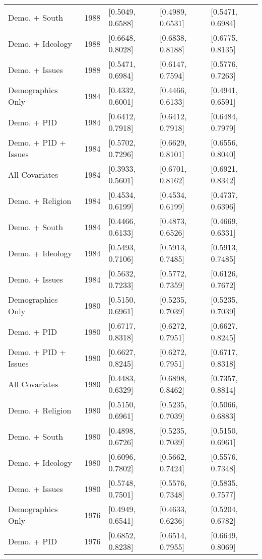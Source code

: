 \begin{longtable}{lrlll}
  Demo. + South & 1988 & [0.5049, 0.6588] & [0.4989, 0.6531] & [0.5471, 0.6984] \\ 
  Demo. + Ideology & 1988 & [0.6648, 0.8028] & [0.6838, 0.8188] & [0.6775, 0.8135] \\ 
  Demo. + Issues & 1988 & [0.5471, 0.6984] & [0.6147, 0.7594] & [0.5776, 0.7263] \\ 
  Demographics Only & 1984 & [0.4332, 0.6001] & [0.4466, 0.6133] & [0.4941, 0.6591] \\ 
  Demo. + PID & 1984 & [0.6412, 0.7918] & [0.6412, 0.7918] & [0.6484, 0.7979] \\ 
  Demo. + PID + Issues & 1984 & [0.5702, 0.7296] & [0.6629, 0.8101] & [0.6556, 0.8040] \\ 
  All Covariates & 1984 & [0.3933, 0.5601] & [0.6701, 0.8162] & [0.6921, 0.8342] \\ 
  Demo. + Religion & 1984 & [0.4534, 0.6199] & [0.4534, 0.6199] & [0.4737, 0.6396] \\ 
  Demo. + South & 1984 & [0.4466, 0.6133] & [0.4873, 0.6526] & [0.4669, 0.6331] \\ 
  Demo. + Ideology & 1984 & [0.5493, 0.7106] & [0.5913, 0.7485] & [0.5913, 0.7485] \\ 
  Demo. + Issues & 1984 & [0.5632, 0.7233] & [0.5772, 0.7359] & [0.6126, 0.7672] \\ 
  Demographics Only & 1980 & [0.5150, 0.6961] & [0.5235, 0.7039] & [0.5235, 0.7039] \\ 
  Demo. + PID & 1980 & [0.6717, 0.8318] & [0.6272, 0.7951] & [0.6627, 0.8245] \\ 
  Demo. + PID + Issues & 1980 & [0.6627, 0.8245] & [0.6272, 0.7951] & [0.6717, 0.8318] \\ 
  All Covariates & 1980 & [0.4483, 0.6329] & [0.6898, 0.8462] & [0.7357, 0.8814] \\ 
  Demo. + Religion & 1980 & [0.5150, 0.6961] & [0.5235, 0.7039] & [0.5066, 0.6883] \\ 
  Demo. + South & 1980 & [0.4898, 0.6726] & [0.5235, 0.7039] & [0.5150, 0.6961] \\ 
  Demo. + Ideology & 1980 & [0.6096, 0.7802] & [0.5662, 0.7424] & [0.5576, 0.7348] \\ 
  Demo. + Issues & 1980 & [0.5748, 0.7501] & [0.5576, 0.7348] & [0.5835, 0.7577] \\ 
  Demographics Only & 1976 & [0.4949, 0.6541] & [0.4633, 0.6236] & [0.5204, 0.6782] \\ 
  Demo. + PID & 1976 & [0.6852, 0.8238] & [0.6514, 0.7955] & [0.6649, 0.8069] \\ 

\end{longtable}
